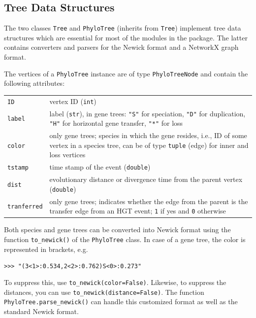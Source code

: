 \documentclass[hidelinks,11pt]{article}
\newcommand{\COMMANDLINE}[1]{\begingroup\par\vspace{3mm}\color{darkgrey}\begin{adjustwidth}{1cm}{1cm}\texttt{#1}\end{adjustwidth}\vspace{3mm}\endgroup}
\begin{document}
\subsection{Tree Data Structures}

The two classes \texttt{Tree} and \texttt{PhyloTree} (inherits from \texttt{Tree}) implement tree data structures which are essential for most of the modules in the package.
The latter contains converters and parsers for the Newick format and a NetworkX graph format.

The vertices of a \texttt{PhyloTree} instance are of type \texttt{PhyloTreeNode} and contain the following attributes:

\vspace{3mm}
\renewcommand{\arraystretch}{1.5}
\begin{tabularx}{0.95\textwidth} { >{\raggedright\arraybackslash}p{3cm} >{\raggedright\arraybackslash}X }
	\texttt{ID} & vertex ID (\texttt{int})\\
	\texttt{label}  & label (\texttt{str}), in gene trees: \texttt{"S"} for speciation, \texttt{"D"} for duplication, \texttt{"H"} for horizontal gene transfer, \texttt{"*"} for loss\\
	\texttt{color} & only gene trees; species in which the gene resides, i.e., ID of some vertex in a species tree, can be of type \texttt{tuple} (edge) for inner and loss vertices\\
	\texttt{tstamp} & time stamp of the event (\texttt{double})\\
	\texttt{dist} & evolutionary distance or divergence time from the parent vertex (\texttt{double})\\
	\texttt{tranferred} & only gene trees; indicates whether the edge from the parent is the transfer edge from an HGT event; \texttt{1} if yes and \texttt{0} otherwise \\
\end{tabularx}
\vspace{3mm}

Both species and gene trees can be converted into Newick format using the function \texttt{to\_newick()} of the \texttt{PhyloTree} class.
In case of a gene tree, the color is represented in brackets, e.g.
\COMMANDLINE{>>> "(3<1>:0.534,2<2>:0.762)S<0>:0.273"}
To suppress this, use \texttt{to\_newick(color=False)}. Likewise, to suppress the distances, you can use \texttt{to\_newick(distance=False)}.
The function \texttt{PhyloTree.parse\_newick()} can handle this customized format as well as the standard Newick format.
\end{document}
